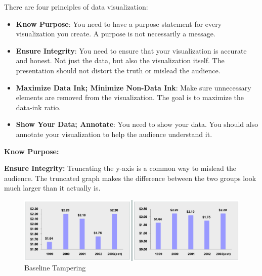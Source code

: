 \documentclass[11pt,fleqn]{book} %
\begin{document}
\begin{theorem}
  There are four principles of data visualization:
  \begin{itemize}
    \item \textbf{Know Purpose}: You need to have a purpose
      statement for every visualization you create. A purpose
      is not necessarily a message.
    \item \textbf{Ensure Integrity}: You need to ensure that
      your visualization is accurate and honest. Not just the
      data, but also the visualization itself. The presentation
      should not distort the truth or mislead the audience.
    \item \textbf{Maximize Data Ink; Minimize Non-Data Ink}:
      Make sure unnecessary elements are removed from the
      visualization. The goal is to maximize the data-ink ratio.
    \item \textbf{Show Your Data; Annotate}:
      You need to show your data. You should also annotate
      your visualization to help the audience understand it.
  \end{itemize}
\end{theorem}

\begin{example}
  \textbf{Know Purpose:}
\end{example}

\begin{example}
  \textbf{Ensure Integrity:}
  Truncating the y-axis is a common way to
  mislead the audience. The truncated graph
  makes the difference between the two
  groups look much larger than it actually is.
  \begin{figure}[hibt!]
    \centering
    \includegraphics[width=0.8\linewidth]{Pictures/integrity-baseline.png}
    \caption{Baseline Tampering}
    \label{fig:bias-baseline}
  \end{figure}
\end{example}
\end{document}

